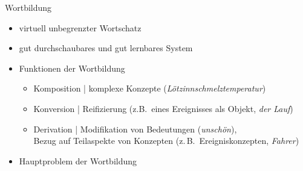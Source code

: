 \begin{frame}
  {Wortbildung}
  \onslide<+->
  \begin{itemize}[<+->]
    \item virtuell unbegrenzter Wortschatz
      \Zeile
    \item gut durchschaubares und \alert{gut lernbares} System\\
      \Zeile
    \item Funktionen der Wortbildung
      \begin{itemize}
        \item Komposition | \alert{komplexe Konzepte} (\textit{Lötzinnschmelztemperatur})
        \item Konversion | \alert{Reifizierung} (z.B.\ eines Ereignisses als Objekt, \textit{der Lauf})
        \item Derivation | \alert{Modifikation von Bedeutungen} (\textit{\alert{un}schön}),\\
          \alert{Bezug auf Teilaspekte von Konzepten} (z.\,B.\ Ereigniskonzepten, \textit{Fahr\alert{er}})
      \end{itemize}
      \Halbzeile
    \item Hauptproblem der Wortbildung\\
  \end{itemize}
\end{frame}


